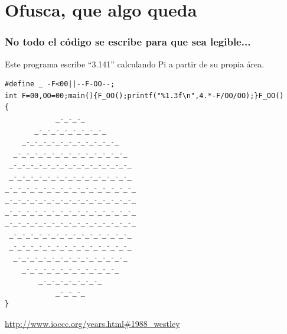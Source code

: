 %
%

\section{Ofusca, que algo queda}

\begin{frame}[fragile]
\frametitle{No todo el código se escribe para que sea legible...}

Este programa escribe ``3.141'' calculando Pi a partir de su propia área.

{\tiny
\begin{verbatim}
#define _ -F<00||--F-OO--;
int F=00,OO=00;main(){F_OO();printf("%1.3f\n",4.*-F/OO/OO);}F_OO()
{
            _-_-_-_
       _-_-_-_-_-_-_-_-_
    _-_-_-_-_-_-_-_-_-_-_-_
  _-_-_-_-_-_-_-_-_-_-_-_-_-_
 _-_-_-_-_-_-_-_-_-_-_-_-_-_-_
 _-_-_-_-_-_-_-_-_-_-_-_-_-_-_
_-_-_-_-_-_-_-_-_-_-_-_-_-_-_-_
_-_-_-_-_-_-_-_-_-_-_-_-_-_-_-_
_-_-_-_-_-_-_-_-_-_-_-_-_-_-_-_
_-_-_-_-_-_-_-_-_-_-_-_-_-_-_-_
 _-_-_-_-_-_-_-_-_-_-_-_-_-_-_
 _-_-_-_-_-_-_-_-_-_-_-_-_-_-_
  _-_-_-_-_-_-_-_-_-_-_-_-_-_
    _-_-_-_-_-_-_-_-_-_-_-_
        _-_-_-_-_-_-_-_
            _-_-_-_
}
\end{verbatim}
}

\begin{flushright}
{\small
\url{http://www.ioccc.org/years.html#1988_westley}
}
\end{flushright}

\end{frame}


